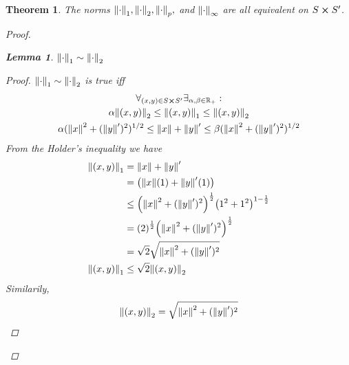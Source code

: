 \documentclass[]{article}
\newcommand{\R}{\mathbb{R}}
\newtheorem{theorem}{Theorem}
\newtheorem{lemma}{Lemma}
\begin{document}
\begin{theorem}
    The norms $\norm{\cdot}_1,\norm{\cdot}_2,\norm{\cdot}_p,$ and $\norm{\cdot}_\infty$ are all equivalent on $S \cross S'$.
    \begin{proof}
        \begin{lemma}\label{lem:2-1to2}
            $\norm{\cdot}_1 \sim \norm{\cdot}_2$
            \begin{proof}
                $\norm{\cdot}_1 \sim \norm{\cdot}_2$ is true iff
                \begin{multline*}
                    \forall_{(x,y) \in S \cross S'} \exists_{\alpha,\beta \in \R_+} :\\
                    \alpha \norm{(x,y)}_2 
                        \leq \norm{(x,y)}_1 
                        \leq \norm{(x,y)}_2\\
                    \alpha (\norm{x}^2 + (\norm{y}')^2)^{1/2}
                        \leq \norm{x} + \norm{y}'
                        \leq \beta (\norm{x}^2 + (\norm{y}')^2)^{1/2}\\
                \end{multline*}
                From the Holder's inequality we have 
                \begin{align*}
                    \norm{(x,y)}_1 
                        &= \norm{x} + \norm{y}'\\
                    &= \qty(\norm{x} (1) + \norm{y}' (1))\\
                    &\leq \qty(\norm{x}^2 + (\norm{y}')^2)^{\frac{1}{2}} \qty(1^2 + 1^2)^{1 - \frac{1}{2}}\\
                    &= \qty(2)^\frac{1}{2} \qty(\norm{x}^2 + (\norm{y}')^2)^{\frac{1}{2}}\\
                    &= \sqrt{2} \sqrt{\norm{x}^2 + (\norm{y}')^2}\\
                    \norm{(x,y)}_1
                        &\leq \sqrt{2} \norm{(x,y)}_2
                \end{align*}
                Similarily, 
                \begin{align*}
                    \norm{(x,y)}_2 
                        &= \sqrt{\norm{x}^2 + (\norm{y}')^2}\\

\end{align*}
\end{proof}
\end{lemma}
\end{proof}
\end{theorem}
\end{document}
